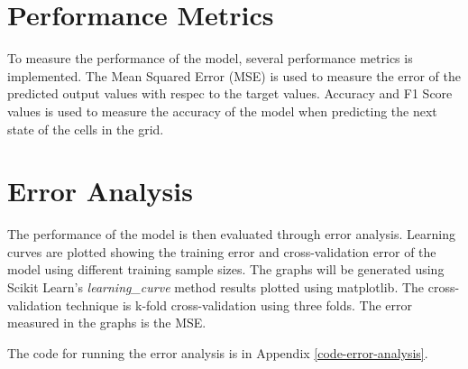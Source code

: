 \section{Performance Metrics}
    To measure the performance of the model, several performance metrics is implemented. The Mean Squared Error (MSE) is used to measure the error of the predicted output values with respec to the target values. Accuracy and F1 Score values is used to measure the accuracy of the model when predicting the next state of the cells in the grid.

\section{Error Analysis}
    The performance of the model is then evaluated through error analysis. Learning curves are plotted showing the training error and cross-validation error of the model using different training sample sizes. The graphs will be generated using Scikit Learn's \textit{learning\_curve} method results plotted using matplotlib. The cross-validation technique is k-fold cross-validation using three folds. The error measured in the graphs is the MSE.

    The code for running the error analysis is in Appendix \ref{code-error-analysis}.
